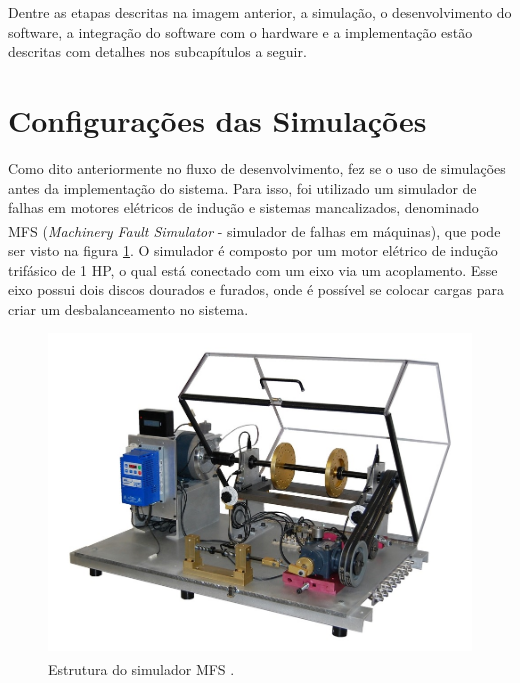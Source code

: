 Dentre as etapas descritas na imagem anterior, a simulação, o desenvolvimento do software, a integração do software com o hardware e a implementação
estão descritas com detalhes nos subcapítulos a seguir.


% 

\section{Configurações das Simulações}

Como dito anteriormente no fluxo de desenvolvimento, fez se o uso de simulações antes da implementação do sistema.
Para isso, foi utilizado um simulador de falhas em motores elétricos de indução e sistemas mancalizados, denominado
MFS \textsuperscript \textregistered (\textit{Machinery Fault Simulator} - simulador de falhas em máquinas), que pode ser visto na figura 
\ref{fig:real_plant}. O simulador é composto por um motor elétrico de indução trifásico de 1 HP, o qual está conectado com um eixo via um 
acoplamento. Esse eixo possui dois discos dourados e furados, onde é possível se colocar cargas para criar um desbalanceamento no sistema.

\begin{figure}[H]
    \caption{Estrutura do simulador MFS \textsuperscript \textregistered.}
    \begin{center}
        \includegraphics[scale=.4]{metodologia/img/real_plant.jpeg}
    \end{center}
    \label{fig:real_plant}
\end{figure}

